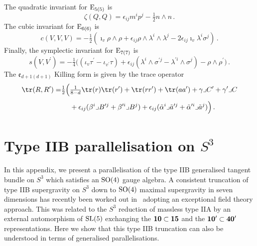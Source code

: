 \documentclass[debug]{phd}
\begin{document}
			The quadratic invariant for $\mathrm{E}_{5(5)}$ is
					\begin{equation}\label{eq:IIB_quadratic}
						\zeta(Q,Q)=\epsilon_{ij}m^i p^j -\tfrac{1}{2} n\wedge n\, .
					\end{equation}
			The cubic invariant for $\mathrm{E}_{6(6)}$ is
					\begin{equation}\label{eq:IIB_cubic}
						c(V,V,V)=-\tfrac{1}{2}(\imath_{v}\rho\wedge\rho+\epsilon_{ij}\rho\wedge\lambda^{i}\wedge\lambda^{j}-2\epsilon_{ij}\imath_{v}\lambda^{i}\sigma^{j}) \, .
					\end{equation}
			Finally, the symplectic invariant for $\mathrm{E}_{7(7)}$ is
					\begin{equation}\label{eq:IIB_symplectic}
						s(V,V^{\prime})=-\tfrac{1}{4}\bigl((\iota_{v}\tau^{\prime}-\iota_{v^{\prime}}\tau)+\epsilon_{ij}(\lambda^{i}\wedge\sigma^{\prime j}-\lambda^{\prime i}\wedge\sigma^{j})-\rho\wedge\rho^{\prime}\bigr) \, .	
					\end{equation}
			The $\mathfrak{e}_{d+1(d+1)}$ Killing form is given by the trace operator
					\begin{equation}\label{eq:IIB_Killing}
						\begin{split}
							\tr(R,R^{\prime}) =& \tfrac{1}{2}\Bigl(\tfrac{1}{8-d}\tr(r)\tr(r^{\prime})+\tr(rr^{\prime})+\tr(aa^{\prime})+\gamma\lrcorner C^{\prime}+\gamma^{\prime}\lrcorner C \\
 											& \phantom{\frac{1}{2}\biggl[} +\epsilon_{ij}(\beta^{i}\lrcorner B^{\prime j}+\beta^{\prime i}\lrcorner B^{j}) +\epsilon_{ij}(\tilde{\alpha}^{i}\lrcorner\tilde{a}^{\prime j}+\tilde{\alpha}^{\prime i}\lrcorner\tilde{a}^{j})\Bigr)\, .
						\end{split}
					\end{equation}

		\section{Type IIB parallelisation on $S^3$}\label{IIBonS3}

In this appendix, we present a parallelisation of the type IIB generalised tangent bundle on $S^3$ which satisfies an $\mathrm{SO}(4)$ gauge algebra.
 A consistent truncation of type IIB supergravity on $S^3$ down to $\mathrm{SO}(4)$ maximal supergravity in seven dimensions has recently been worked out in~\cite{Malek:2015hma} adopting an exceptional field theory approach. This was related to the $S^3$ reduction of massless type IIA by an external automorphism of $\mathrm{SL}(5)$ exchanging the ${\bf 10}\subset{\bf 15}$ and the ${\bf 10'}\subset {\bf 40'}$ representations. 
 Here we show that this type IIB truncation can also be understood in terms of generalised parallelisations.
\end{document}
